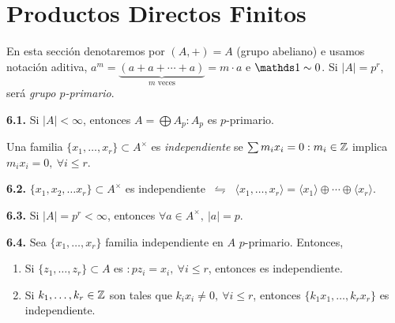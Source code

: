 \section{Productos Directos Finitos}

En esta sección denotaremos por \( (A,+) = A\) (grupo abeliano) e usamos notación aditiva, \(a^m = \underbrace{(a + a + \cdots + a)}_{m \text{ veces}} = m\cdot a\) e \(\id \sim 0\). Si \(|A|=p^r\), será \emph{grupo $p$-primario}.

\hypertarget{thm61}{}
\begin{theorem}
    \textbf{6.1.} Si \(|A|< \infty\), entonces \(A = \bigoplus A_p : A_p\) es \(p\)-primario. 
\end{theorem}

\begin{definition}
    Una familia \(\{x_1, \ldots, x_r \}\subset A^\times\) es \emph{independiente} se \(\sum m_ix_i =0 : m_i \in \mathbb{Z}\) implica \(m_ix_i =0 , \ \forall i \leq r\). 
\end{definition}

\hypertarget{lemma62}{}
\begin{lemma}
    \textbf{6.2.} \(\{x_1, x_2, \ldots x_r\}\subset A^\times \) es independiente \(\ \leftrightharpoons \ \) \(\langle x_1, \ldots, x_r\rangle = \langle x_1\rangle \oplus \cdots \oplus \langle x_r\rangle\).  
\end{lemma}


\begin{corollary}
    \textbf{6.3.} Si \(|A| = p^r < \infty\), entonces \(\forall a \in A^\times, \ |a| =p\).  
\end{corollary}

\begin{lemma}
    \textbf{6.4.} Sea \(\{x_1, \ldots, x_r\}\) familia independiente en \(A\) $p$-primario. Entonces, 
    \vspace{-0.3cm}
    \begin{enumerate}[label = \roman*., left = 0.1cm]
        \item Si \(\{z_1, \ldots, z_r\}\subset A\) es \(: pz_i = x_i, \ \forall i \leq r\), entonces es independiente.  
        \item Si \(k_1, \ldots, k_r \in \mathbb{Z}\) son tales que \(k_ix_i \neq 0, \ \forall i \leq r\), entonces \(\{k_1x_1, \ldots, k_rx_r\}\) es independiente. 
    \end{enumerate}
\end{lemma}

